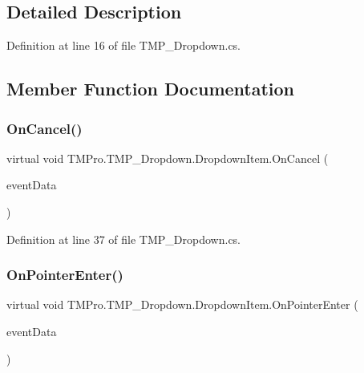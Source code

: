 \subsection{Detailed Description}


Definition at line 16 of file T\+M\+P\+\_\+\+Dropdown.\+cs.



\subsection{Member Function Documentation}
\mbox{\label{class_t_m_pro_1_1_t_m_p___dropdown_1_1_dropdown_item_ac6e4a3fd548e49599be41450f77de0b5}} 
\subsubsection{\texorpdfstring{OnCancel()}{OnCancel()}}
{\footnotesize\ttfamily virtual void T\+M\+Pro.\+T\+M\+P\+\_\+\+Dropdown.\+Dropdown\+Item.\+On\+Cancel (\begin{DoxyParamCaption}\item[{Base\+Event\+Data}]{event\+Data }\end{DoxyParamCaption})\hspace{0.3cm}{\ttfamily [virtual]}}



Definition at line 37 of file T\+M\+P\+\_\+\+Dropdown.\+cs.

\mbox{\label{class_t_m_pro_1_1_t_m_p___dropdown_1_1_dropdown_item_a929b6985b92f36c6db84938cfd94e6cf}} 
\subsubsection{\texorpdfstring{OnPointerEnter()}{OnPointerEnter()}}
{\footnotesize\ttfamily virtual void T\+M\+Pro.\+T\+M\+P\+\_\+\+Dropdown.\+Dropdown\+Item.\+On\+Pointer\+Enter (\begin{DoxyParamCaption}\item[{Pointer\+Event\+Data}]{event\+Data }\end{DoxyParamCaption})\hspace{0.3cm}{\ttfamily [virtual]}}



